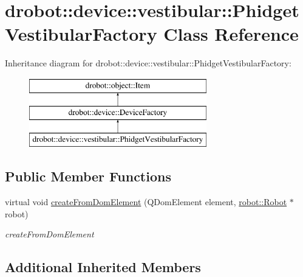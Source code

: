 \hypertarget{classdrobot_1_1device_1_1vestibular_1_1PhidgetVestibularFactory}{\section{drobot\-:\-:device\-:\-:vestibular\-:\-:Phidget\-Vestibular\-Factory Class Reference}
\label{classdrobot_1_1device_1_1vestibular_1_1PhidgetVestibularFactory}
}
Inheritance diagram for drobot\-:\-:device\-:\-:vestibular\-:\-:Phidget\-Vestibular\-Factory\-:\begin{figure}[H]
\begin{center}
\leavevmode
\includegraphics[height=3.000000cm]{classdrobot_1_1device_1_1vestibular_1_1PhidgetVestibularFactory}
\end{center}
\end{figure}
\subsection*{Public Member Functions}
\begin{DoxyCompactItemize}
\item 
virtual void \hyperlink{classdrobot_1_1device_1_1vestibular_1_1PhidgetVestibularFactory_ae877ec4a20bcd09fed94f00952b41f7d}{create\-From\-Dom\-Element} (Q\-Dom\-Element element, \hyperlink{classdrobot_1_1robot_1_1Robot}{robot\-::\-Robot} $\ast$robot)
\begin{DoxyCompactList}\small\item\em create\-From\-Dom\-Element \end{DoxyCompactList}\end{DoxyCompactItemize}
\subsection*{Additional Inherited Members}


